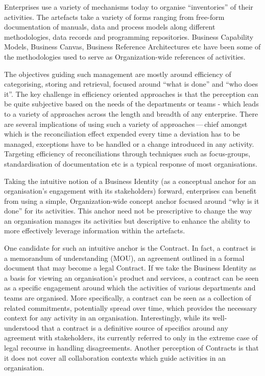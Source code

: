 Enterprises use a variety of mechanisms today to organise “inventories” of their activities.
The artefacts take a variety of forms ranging from free-form documentation of manuals,
data and process models along different methodologies, data records and programming repositories.
Business Capability Models, Business Canvas, Business Reference Architectures etc have been some of the
methodologies used to serve as Organization-wide references of activities.

The objectives guiding such management are mostly around efficiency of categorising, storing and retrieval,
focused around “what is done” and “who does it”.
The key challenge in efficiency oriented approaches is that the perception can be quite subjective based
on the needs of the departments or teams - which leads to a variety of approaches across the length and
breadth of any enterprise.
There are several implications of using such a variety of approaches\,---\,chief amongst which is the
reconciliation effect expended every time a deviation has to be managed,
exceptions have to be handled or a change introduced in any activity.
Targeting efficiency of reconciliations through techniques such as focus-groups, standardisation of documentation etc
is a typical response of most organisations.

Taking the intuitive notion of a Business Identity (as a conceptual anchor for an organisation’s engagement with
its stakeholders) forward, enterprises can benefit from using a simple, Organization-wide concept anchor
focused around “why is it done” for its activities. This anchor need not be prescriptive to change the way an
organisation manages its activities but descriptive to enhance the ability to more effectively leverage information
within the artefacts.

One candidate for such an intuitive anchor is the Contract.
In fact, a contract is a memorandum of understanding (MOU), an agreement outlined in a formal document
that may become a legal Contract.
If we take the Business Identity as a basis for viewing an organisation’s product and services,
a contract can be seen as a specific engagement around which the activities of various departments and teams are
organised.
More specifically, a contract can be seen as a collection of related commitments, potentially spread over time,
which provides the necessary context for any activity in an organisation.
Interestingly, while its well-understood that a contract is a definitive source of specifics around any
agreement with stakeholders, its currently referred to only in the extreme case of legal recourse in
handling disagreements.
Another perception of Contracts is that it does not cover all collaboration contexts which guide activities
in an organisation.

